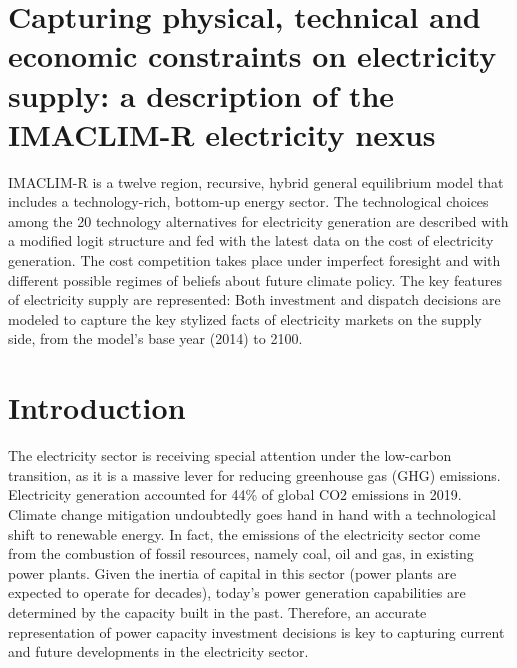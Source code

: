 \section*{Capturing physical, technical and economic constraints on electricity supply: a description of the IMACLIM-R electricity nexus  }

IMACLIM-R is a twelve region, recursive, hybrid general equilibrium model that includes a technology-rich, bottom-up energy sector. The technological choices among the 20 technology alternatives for electricity generation are described with a modified logit structure and fed with the latest data on the cost of electricity generation. The cost competition takes place under imperfect foresight and with different possible regimes of beliefs about future climate policy. The key features of electricity supply are represented:  Both investment and dispatch decisions are modeled to capture the key stylized facts of electricity markets on the supply side, from the model's base year (2014) to 2100.


\section{Introduction}
The electricity sector is receiving special attention under the low-carbon transition, as it is a massive lever for reducing greenhouse gas (GHG) emissions. Electricity generation accounted for 44\% of global CO2 emissions in 2019. Climate change mitigation undoubtedly goes hand in hand with a technological shift to renewable energy. In fact, the emissions of the electricity sector come from the combustion of fossil resources, namely coal, oil and gas, in existing power plants. Given the inertia of capital in this sector (power plants are expected to operate for decades), today's power generation capabilities are determined by the capacity built in the past. Therefore, an accurate representation of power capacity investment decisions is key to capturing current and future developments in the electricity sector.

